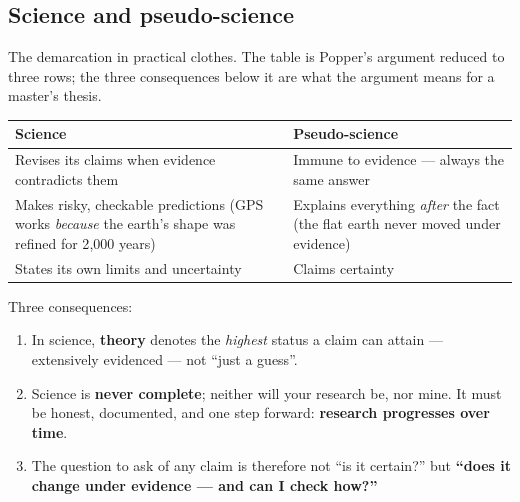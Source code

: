 \documentclass[11pt,a4paper,british,twoside=false,headings=small,chapterprefix=false,numbers=noenddot]{scrbook}
\begin{document}
\subsection{Science and pseudo-science}
The demarcation in practical clothes. The table is Popper's argument reduced to three rows; the three consequences below it are what the argument means for a master's thesis.
\begin{center}\small
\small
  \renewcommand{\arraystretch}{1.25}
  \begin{tabular}{@{}p{6.2cm}p{6.4cm}@{}}
    \toprule
    \textbf{Science} & \textbf{Pseudo-science}\\
    \midrule
    Revises its claims when evidence contradicts them & Immune to evidence --- always the same answer\\
    Makes risky, checkable predictions (GPS works \emph{because} the earth's shape was refined for 2{,}000 years) & Explains everything \emph{after} the fact (the flat earth never moved under evidence)\\
    States its own limits and uncertainty & Claims certainty\\
    \bottomrule
  \end{tabular}
  

  Three consequences:
  \begin{enumerate}\setlength{\itemsep}{0.15em}
    \item In science, \textbf{theory} denotes the \emph{highest} status a
          claim can attain --- extensively evidenced --- not ``just a guess''.
    \item Science is \textbf{never complete}; neither will your research be,
          nor mine. It must be honest, documented, and one step forward:
          \textbf{research progresses over time}.
    \item The question to ask of any claim is therefore not ``is it certain?''
          but \textbf{``does it change under evidence --- and can I check
          how?''}
  \end{enumerate}
\end{center}
\end{document}
